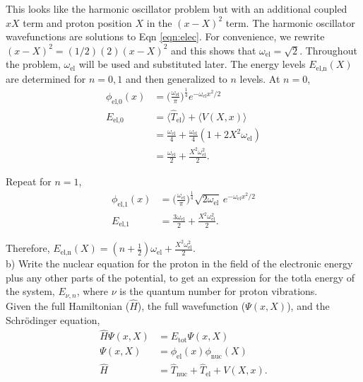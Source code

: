\documentclass{article}
\begin{document}
This looks like the harmonic oscillator problem but with an additional
coupled $xX$ term and proton position $X$ in the $(x-X)^2$ term.
The harmonic oscillator wavefunctions are solutions to Eqn \eqref{eqn:elec}.
For convenience, we rewrite $(x-X)^2=(1/2)(2)(x-X)^2$ and this shows that
$\omega_{\text{el}}=\sqrt{2}$. Throughout the problem, $\omega_{\text{el}}$ will be used
and substituted later. The energy levels $E_{\text{el,n}}(X)$ are determined for $n=0,1$
and then generalized to $n$ levels. At $n=0$,
\begin{align}
  \phi_{\text{el,0}}(x) & = \Bigg(\frac{\omega_{\text{el}}}{\pi}\Bigg)^{\frac{1}{4}}
  e^{-\omega_{\text{el}}x^2/2} \\
  E_{\text{el,0}} & = \langle \hat{T}_{\text{el}}\rangle + \langle V(X,x) \rangle \nonumber \\
  & = \frac{\omega_{\text{el}}}{4} + \frac{\omega_{\text{el}}}{4}(1+2X^2\omega_{\text{el}}) \nonumber\\
  & = \frac{\omega_{\text{el}}}{2} + \frac{X^2\omega_{\text{el}}^2}{2}.
\end{align}

Repeat for $n=1$,
\begin{align}
  \phi_{\text{el,1}}(x) & = \Bigg(\frac{\omega_{\text{el}}}{\pi}\Bigg)^{\frac{1}{4}}
  \sqrt{2\omega_{\text{el}}}\,e^{-\omega_{\text{el}}x^2/2} \\
  E_{\text{el,1}} & = \frac{3\omega_{\text{el}}}{2} + \frac{X^2\omega_{\text{el}}^2}{2}.
\end{align}

Therefore, $E_{\text{el,n}}(X)=(n+\frac{1}{2})\omega_{\text{el}} + \frac{X^2\omega_{\text{el}}^2}{2}$.
\\

\noindent b) Write the nuclear equation for the proton in the field of the
electronic energy plus any other parts of the potential, to get an expression
for the totla energy of the system, $E_{\nu,n}$, where $\nu$ is the quantum
number for proton vibrations.
\\

Given the full Hamiltonian ($\hat{H}$), the full wavefunction ($\Psi(x,X)$),
and the Schr\"odinger equation,
\begin{align}
  \hat{H}\Psi(x,X) & = E_{\text{tot}}\Psi(x,X) \\
  \Psi(x,X) & = \phi_{\text{el}}(x)\phi_{\text{nuc}}(X) \\
  \hat{H} & = \hat{T}_{\text{nuc}} + \hat{T}_{\text{el}} + V(X,x).
\end{align}
\end{document}
